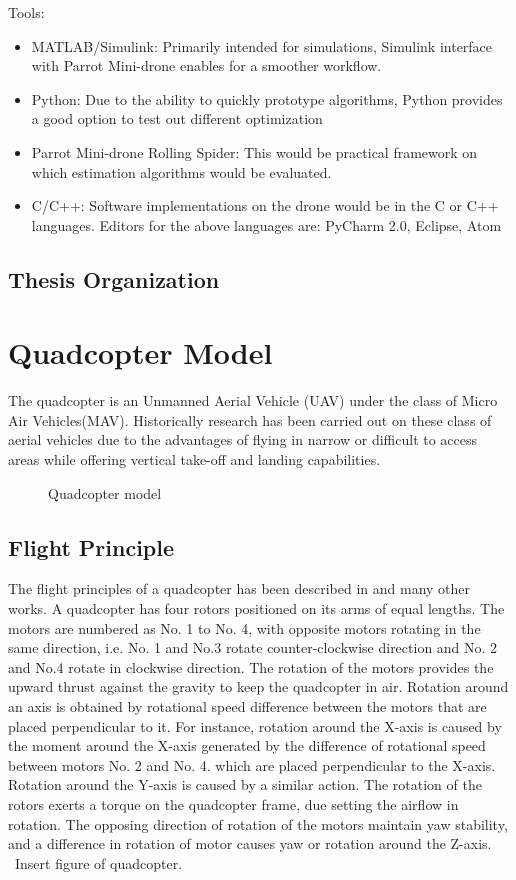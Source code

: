 \documentclass{article}
\begin{document}
Tools: 
\begin{itemize}
\item MATLAB/Simulink: Primarily intended for simulations, Simulink interface with Parrot Mini-drone enables for a smoother workflow.
\item Python: Due to the ability to quickly prototype algorithms, Python provides a good option to test out different optimization
\item Parrot Mini-drone Rolling Spider: This would be practical framework on which estimation algorithms would be evaluated. 
\item C/C++: Software implementations on the drone would be in the C or C++ languages. 
Editors for the above languages are: PyCharm 2.0, Eclipse, Atom
\end{itemize}

\subsection{Thesis Organization}


\section{Quadcopter Model}
The quadcopter is an Unmanned Aerial Vehicle (UAV) under the class of Micro Air Vehicles(MAV). Historically research has been carried out on these class of aerial vehicles due to the advantages of flying in narrow or difficult to access areas while offering vertical take-off and landing capabilities. 
\begin{figure}
\centerline{}
\caption{Quadcopter model}
\label{quad_red_balls}
\end{figure}

\subsection{Flight Principle}
The flight principles of a quadcopter has been described in \cite{RN71} and many other works.
A quadcopter has four rotors positioned on its arms of equal lengths. The motors are numbered as No. 1 to No. 4, with opposite motors rotating in the same direction, i.e. No. 1 and No.3 rotate counter-clockwise direction and No. 2 and No.4 rotate in clockwise direction. The rotation of the motors provides the upward thrust against the gravity to keep the quadcopter in air. Rotation around an axis is obtained by rotational speed difference between the motors that are placed perpendicular to it. For instance, rotation around the X-axis is caused by the moment around the X-axis generated by the difference of rotational speed between motors No. 2 and No. 4. which are placed perpendicular to the X-axis. Rotation around the Y-axis is caused by a similar action. The rotation of the rotors exerts a torque on the quadcopter frame, due setting the airflow in rotation. The opposing direction of rotation of the motors maintain yaw stability, and a difference in rotation of motor causes yaw or rotation around the Z-axis.\\\ Insert figure of quadcopter.
\end{document}
